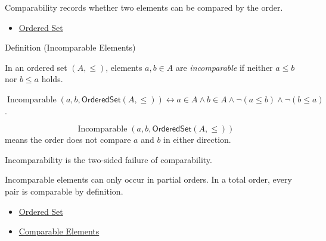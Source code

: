 \begin{remark*}[Interpretation]
Comparability records whether two elements can be compared by the order.
\end{remark*}

\begin{dependencies}
\begin{itemize}
  \item \hyperref[def:ordered-set]{Ordered Set}
\end{itemize}
\end{dependencies}

\begin{definitionbox}{Definition (Incomparable Elements)}
\begin{definition}\label{def:incomparable}
In an ordered set $(A,\leq)$, elements $a,b \in A$ are \emph{incomparable} if
neither $a \leq b$ nor $b \leq a$ holds.
\end{definition}
\end{definitionbox}

\begin{remark*}
$\operatorname{Incomparable}(a,b,\mathsf{OrderedSet}(A,\leq))
\leftrightarrow a\in A\wedge b\in A\wedge\neg(a\leq b)\wedge\neg(b\leq a)$.
\end{remark*}

\begin{remark*}
\[
  \operatorname{Incomparable}(a,b,\mathsf{OrderedSet}(A,\leq))
\] means the order
does not compare $a$ and $b$ in either direction.
\end{remark*}

\begin{remark*}[Interpretation]
Incomparability is the two-sided failure of comparability.
\end{remark*}

\begin{remark*}[Exposition]
Incomparable elements can only occur in partial orders. In a total order,
every pair is comparable by definition.
\end{remark*}

\begin{dependencies}
\begin{itemize}
  \item \hyperref[def:ordered-set]{Ordered Set}
  \item \hyperref[def:comparable]{Comparable Elements}
\end{itemize}
\end{dependencies}


